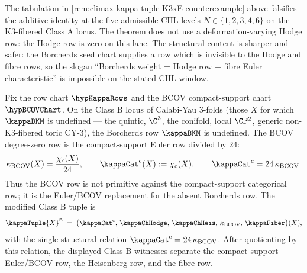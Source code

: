 \begin{remark}
\label{rem:kappa-primitivity-vs-table}
The tabulation in
\cref{rem:climax-kappa-tuple-K3xE-counterexample} above
falsifies the additive identity at the five admissible CHL levels
\(N \in \{1,2,3,4,6\}\) on the K3-fibered Class A locus.  The theorem
does not use a deformation-varying Hodge row: the Hodge row is zero on
this lane.  The structural content is sharper and safer: the
Borcherds seed chart supplies a row which is invisible to the Hodge
and fibre rows, so the slogan ``Borcherds weight = Hodge row + fibre
Euler characteristic'' is impossible on the stated CHL window.
\end{remark}

\begin{theorem}
\label{thm:kappa-tuple-primitivity-class-B}%
%
%
Fix the row chart \(\hypKappaRows\) and the BCOV compact-support chart
\(\hypBCOVChart\). On the Class B locus of Calabi-Yau $3$-folds (those
$X$ for which
$\kappaBKM$ is undefined --- the quintic, $\C^3$, the conifold,
local $\C\mathbb{P}^2$, generic non-K3-fibered toric CY-$3$), the
Borcherds row $\kappaBKM$ is undefined.  The BCOV degree-zero row is
the compact-support Euler row divided by \(24\):
\begin{equation}\label{eq:class-b-bcov-euler-relation}
 \kappa_{\mathrm{BCOV}}(X)=\frac{\chi_c(X)}{24},
 \qquad
 \kappaCat^{\mathrm c}(X):=\chi_c(X),
 \qquad
 \kappaCat^{\mathrm c}=24\,\kappa_{\mathrm{BCOV}}.
\end{equation}
Thus the BCOV row is not primitive against the compact-support
categorical row; it is the Euler/BCOV replacement for the absent
Borcherds row.  The modified Class B tuple is
\begin{equation}\label{eq:kappa-tuple-class-B}
\kappaTuple{X}^{\mathsf B}
 \;=\;
 \bigl(\kappaCat^{\mathrm c},\, \kappaChHodge,\,
 \kappaChHeis,\, \kappa_{\mathrm{BCOV}},\, \kappaFiber\bigr)(X),
\end{equation}
with the single structural relation
\(\kappaCat^{\mathrm c}=24\,\kappa_{\mathrm{BCOV}}\).  After quotienting
by this relation, the displayed Class B witnesses separate the
compact-support Euler/BCOV row, the Heisenberg row, and the fibre row.


\end{theorem}
